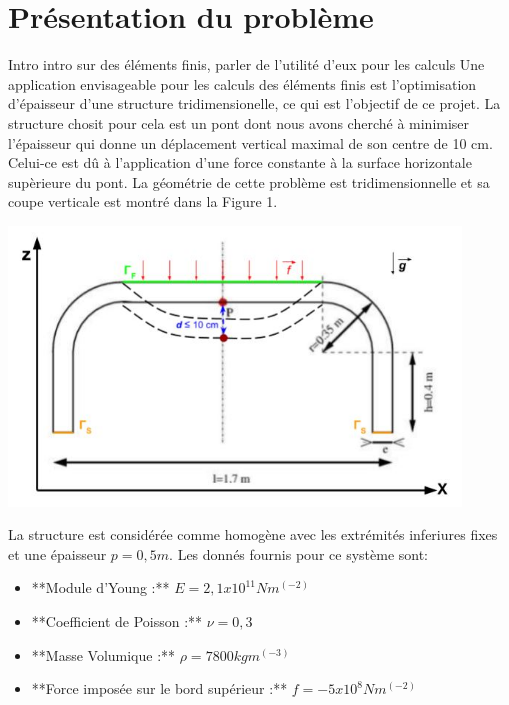 \documentclass{article}
\begin{document}


    \section{Présentation du problème}
    Intro intro sur des éléments finis, parler de l'utilité d'eux pour les calculs    
    Une application envisageable pour les calculs des éléments finis est l'optimisation d'épaisseur d'une structure tridimensionelle, ce qui est l'objectif de ce projet. La structure chosit pour cela est un pont dont nous avons cherché à minimiser l'épaisseur qui donne un déplacement vertical maximal de son centre de 10 cm. Celui-ce est dû à l'application d'une force constante à la surface horizontale supèrieure du pont. La géométrie de cette problème est tridimensionnelle et sa coupe verticale est montré dans la Figure 1. %
    \begin{center}
	{ \includegraphics[width=12cm]{coupe_2D-schema.JPG}}
	\end{center}
    La structure est considérée comme homogène avec les extrémités inferiures fixes et une épaisseur $p = 0,5 m$. Les donnés fournis pour ce système sont:
    
    \begin{itemize}
    \item **Module d'Young :** $E = 2,1x10^11 N m^(-2)$
    \item **Coefficient de Poisson :** $\nu = 0,3$
    \item **Masse Volumique :** $\rho = 7800 kg m^(-3)$
    \item **Force imposée sur le bord supérieur :** $f= - 5x10^8 N m^(-2)$
    \end{itemize}
    
\end{document}
